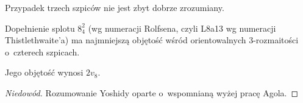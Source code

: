 Przypadek trzech szpiców nie jest zbyt dobrze zrozumiany.
%

\begin{proposition}
    Dopełnienie splotu $8_4^2$ (wg numeracji Rolfsena, czyli L8a13 wg numeracji Thistlethwaite'a) ma najmniejszą objętość wśród orientowalnych 3-rozmaitości o~czterech szpicach.
%
\end{proposition}

Jego objętość wynosi $2v_8$.

\begin{proof}[Niedowód]
%
    Rozumowanie Yoshidy \cite{yoshida2013} oparte o~wspomnianą wyżej pracę Agola.
\end{proof}

%

